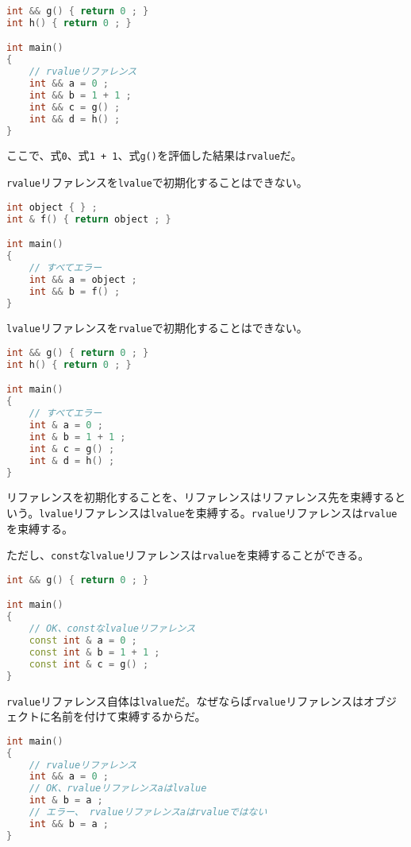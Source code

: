 \begin{lstlisting}[language={C++}]
int && g() { return 0 ; }
int h() { return 0 ; }

int main()
{
    // rvalueリファレンス
    int && a = 0 ;
    int && b = 1 + 1 ;
    int && c = g() ;
    int && d = h() ;
}
\end{lstlisting}

ここで、式\texttt{0}、式\texttt{1 + 1}、式\texttt{g()}を評価した結果は\texttt{rvalue}だ。

\texttt{rvalue}リファレンスを\texttt{lvalue}で初期化することはできない。

\begin{lstlisting}[language={C++}]
int object { } ;
int & f() { return object ; }

int main()
{
    // すべてエラー
    int && a = object ;
    int && b = f() ;
}
\end{lstlisting}

\texttt{lvalue}リファレンスを\texttt{rvalue}で初期化することはできない。

\ifTombow\pagebreak\fi
\begin{lstlisting}[language={C++}]
int && g() { return 0 ; }
int h() { return 0 ; }

int main()
{
    // すべてエラー
    int & a = 0 ;
    int & b = 1 + 1 ;
    int & c = g() ;
    int & d = h() ;
}
\end{lstlisting}

リファレンスを初期化することを、リファレンスはリファレンス先を束縛するという。\texttt{lvalue}リファレンスは\texttt{lvalue}を束縛する。\texttt{rvalue}リファレンスは\texttt{rvalue}を束縛する。

ただし、\texttt{const}な\texttt{lvalue}リファレンスは\texttt{rvalue}を束縛することができる。

\begin{lstlisting}[language={C++}]
int && g() { return 0 ; }

int main()
{
    // OK、constなlvalueリファレンス
    const int & a = 0 ;
    const int & b = 1 + 1 ;
    const int & c = g() ;
}
\end{lstlisting}

\texttt{rvalue}リファレンス自体は\texttt{lvalue}だ。なぜならば\texttt{rvalue}リファレンスはオブジェクトに名前を付けて束縛するからだ。

\begin{lstlisting}[language={C++}]
int main()
{
    // rvalueリファレンス
    int && a = 0 ;
    // OK、rvalueリファレンスaはlvalue
    int & b = a ;
    // エラー、 rvalueリファレンスaはrvalueではない
    int && b = a ;
}
\end{lstlisting}

